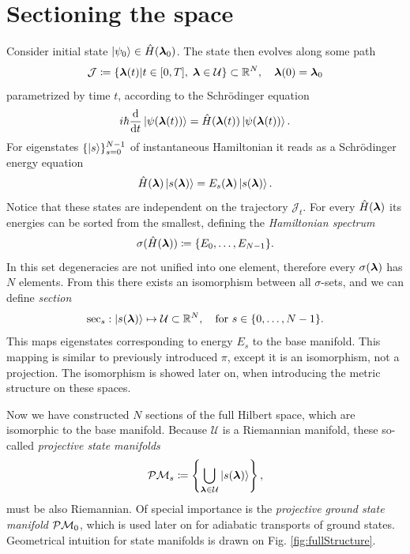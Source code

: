 \section{Sectioning the space}
Consider initial state $\ket{\psi_0}\in \hat{H}({\bm\lambda}_0)$. The state then evolves along some path 
\begin{equation}
    \mathcal J\coloneqq\{{\bm\lambda}(t)|t\in[0,T],\; {\bm\lambda}\in \mathcal U\} \subset \mathbb{R}^N,\quad {\bm\lambda}(0)={\bm\lambda}_0
    \label{eq:defJ}    
\end{equation}
parametrized by time $t$, according to the Schr\"odinger equation
\begin{equation}
    i\hbar \frac{\mathrm{d} }{\mathrm{d} t}\ket{\psi({\bm\lambda}(t))} = \hat{H}({\bm\lambda}(t))\ket{\psi({\bm\lambda}(t))}.
    \label{eq:schrodinger}
\end{equation}
For eigenstates $\{\ket{s}\}_{s=0}^{N-1}$ of instantaneous Hamiltonian it reads as a Schr\"odinger energy equation
\begin{equation}
    \hat{H}({\bm\lambda})\ket{s({\bm\lambda})}=E_s({\bm\lambda})\ket{s({\bm\lambda})}.
    \label{eq:energySchrodinger}
\end{equation}
Notice that these states are independent on the trajectory $\mathcal J_t$.
For every $\hat{H}({\bm\lambda})$ its energies can be sorted from the smallest, defining the \emph{Hamiltonian spectrum}
\begin{equation}
    \sigma(\hat{H}({\bm\lambda}))\coloneqq\{E_0,\dots,E_{N-1}\}.
\end{equation}
In this set degeneracies are not unified into one element, therefore every $\sigma({\bm\lambda})$ has $N$ elements. From this there exists an isomorphism between all $\sigma$-sets, and we can define \emph{section} 
$$\mathrm{sec}_s: \ket{s({\bm\lambda})}\mapsto \mathcal{U}\subset \mathbb{R}^N, \quad \text{for } s\in\{0,\dots, N-1\}.$$
This maps eigenstates corresponding to energy $E_s$ to the base manifold. This mapping is similar to previously introduced $\pi$, except it is an isomorphism, not a projection. The isomorphism is showed later on, when introducing the metric structure on these spaces.

Now we have constructed $N$ sections of the full Hilbert space, which are isomorphic to the base manifold. Because $\mathcal U$ is a Riemannian manifold, these so-called \emph{projective state manifolds} 
\begin{equation}
    \mathcal{P}\mathcal{M}_s\coloneqq \left\{\bigcup_{{\bm\lambda}\in\mathcal U} \ket{s({\bm\lambda})}\right\},
\end{equation}
must be also Riemannian.
Of special importance is the \emph{projective ground state manifold} $\mathcal{P}\mathcal{M}_0$, which is used later on for adiabatic transports of ground states. Geometrical intuition for  state manifolds is drawn on Fig. \ref{fig:fullStructure}. 

